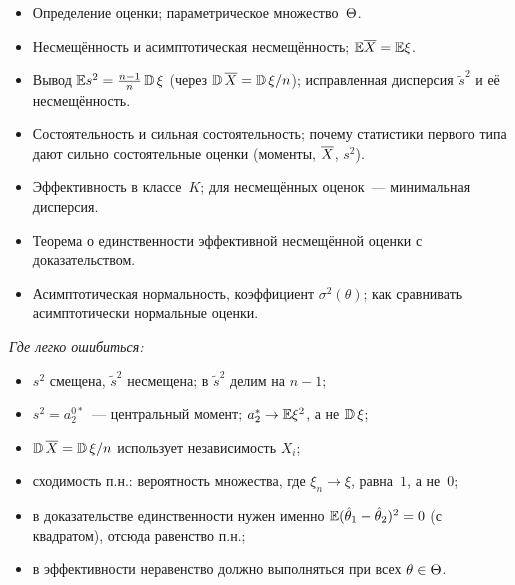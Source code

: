 \begin{keybox}
  \begin{itemize}
    \item Определение оценки; параметрическое множество~$\Theta$.
    \item Несмещённость и асимптотическая несмещённость; $\mathbb{E}\overline{X} = \mathbb{E}\xi$.
    \item Вывод $\mathbb{E} s^2 = \frac{n-1}{n} \operatorname{\mathbb{D}}\xi$ (через $\operatorname{\mathbb{D}}\overline{X} = \operatorname{\mathbb{D}}\xi / n$);
          исправленная дисперсия $\tilde s^2$ и её несмещённость.
    \item Состоятельность и сильная состоятельность; почему статистики первого типа
          дают сильно состоятельные оценки (моменты, $\overline{X}$, $s^2$).
    \item Эффективность в классе~$K$; для несмещённых оценок~--- минимальная дисперсия.
    \item Теорема о единственности эффективной несмещённой оценки с доказательством.
    \item Асимптотическая нормальность, коэффициент $\sigma^2(\theta)$; как сравнивать
          асимптотически нормальные оценки.
  \end{itemize}
  \emph{Где легко ошибиться:}
  \begin{itemize}
    \item $s^2$ смещена, $\tilde s^2$ несмещена; в $\tilde s^2$ делим на $n - 1$;
    \item $s^2 = a_2^{0*}$~--- центральный момент; $a_2^* \to \mathbb{E}\xi^2$, а не $\operatorname{\mathbb{D}}\xi$;
    \item $\operatorname{\mathbb{D}}\overline{X} = \operatorname{\mathbb{D}}\xi / n$ использует независимость $X_i$;
    \item сходимость п.н.: вероятность множества, где $\xi_n \to \xi$, равна~$1$, а не~$0$;
    \item в доказательстве единственности нужен именно $\mathbb{E}(\hat\theta_1 - \hat\theta_2)^2 = 0$
          (с квадратом), отсюда равенство п.н.;
    \item в эффективности неравенство должно выполняться при всех $\theta \in \Theta$.
  \end{itemize}
\end{keybox}
